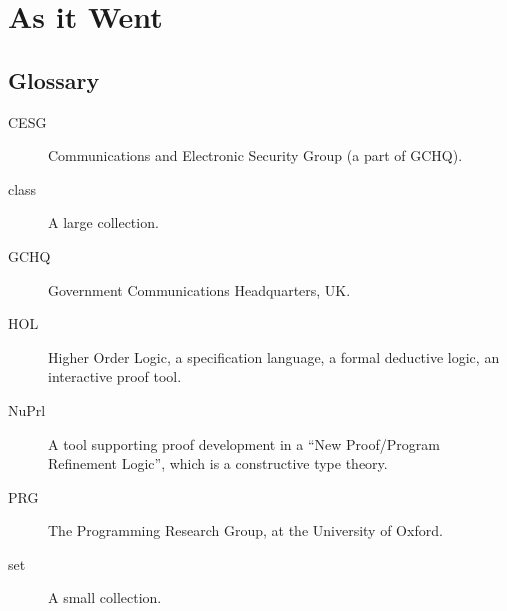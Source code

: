\documentclass[10pt,titlepage]{book}
\begin{document}
\part{As it Went}

\appendix

\chapter{Glossary}\label{glossary}

\begin{description}
\item[CESG]{} Communications and Electronic Security Group (a part of GCHQ).
\item[class]{} A large collection.
\item[GCHQ]{} Government Communications Headquarters, UK.
\item[HOL]{} Higher Order Logic, a specification language, a formal deductive logic, an interactive proof tool.
\item[NuPrl]{} A tool supporting proof development in a ``New Proof/Program Refinement Logic'', which is a constructive type theory.
\item[PRG]{} The Programming Research Group, at the University of Oxford.
\item[set]{} A small collection.
\end{description}

\backmatter




\label{index}
\twocolumn[]
{\small\printindex}
\end{document}
